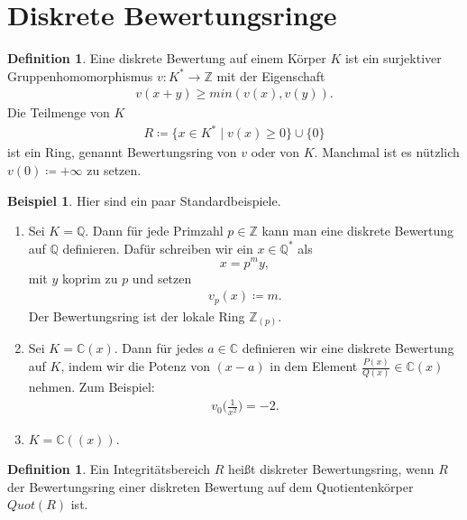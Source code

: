 \documentclass[reqno,12pt]{article}
\numberwithin{equation}{section}
\newcommand{\bC}{\mathbb{C}}
\newcommand{\bQ}{\mathbb{Q}}
\newcommand{\bZ}{\mathbb{Z}}
\theoremstyle{plain}
\theoremstyle{definition}
\newtheorem{definition}[thm]{Definition}
\newtheorem{example}[thm]{Beispiel}
\begin{document}
\newpage
\section{Diskrete Bewertungsringe}


\begin{definition}
Eine {\sf diskrete Bewertung} auf einem Körper $K$ ist ein surjektiver Gruppenhomomorphismus $v \colon K^* \to \bZ$ mit der Eigenschaft
\begin{align}\label{eq-discrete-valuation}
v(x+y) \geq min (v(x),v(y)).
\end{align}
Die Teilmenge von $K$
\begin{align*}
R \coloneqq \{x \in K^* \mid v(x) \geq 0 \}  \cup \{0\}
\end{align*}
ist ein Ring, genannt {\sf Bewertungsring von $v$ oder von $K$}. Manchmal ist es nützlich $v(0) \coloneqq + \infty$ zu setzen.
\end{definition}


\begin{example}
Hier sind ein paar Standardbeispiele.
\begin{enumerate}
\item Sei $K = \bQ$. Dann für jede Primzahl $p \in \bZ$ kann man eine diskrete Bewertung auf $\bQ$ definieren. Dafür schreiben wir ein $x \in \bQ^*$ als
$$
x = p^m y,
$$
mit $y$ koprim zu $p$ und setzen
\begin{align*}
v_p(x) \coloneqq m.
\end{align*}
Der Bewertungsring ist der lokale Ring $\bZ_{(p)}$.

\item Sei $K=\bC(x)$. Dann für jedes $a \in \bC$ definieren wir eine diskrete Bewertung auf $K$, indem wir die Potenz von $(x-a)$ in dem Element $\frac{P(x)}{Q(x)} \in \bC(x)$ nehmen. Zum Beispiel:
\begin{align*}
v_0 \Big(\frac{1}{x^2}\Big) = -2.
\end{align*}

\item $K = \bC((x))$.
\end{enumerate}
\end{example}


\begin{definition}
Ein Integritätsbereich $R$ heißt {\sf diskreter Bewertungsring}, wenn $R$ der Bewertungsring einer diskreten Bewertung auf dem Quotientenkörper $Quot(R)$ ist.
\end{definition}
\end{document}
